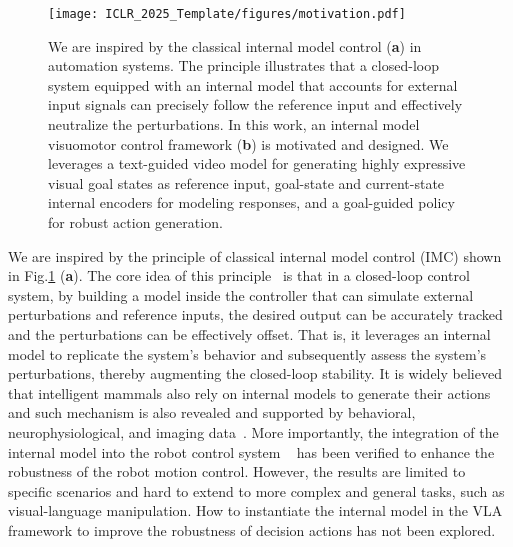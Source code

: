 \begin{figure}[t]
\vspace{-2em}
\centering
\texttt{[image: ICLR\_2025\_Template/figures/motivation.pdf]}
\caption{
We are inspired by the classical internal model control (\textbf{a}) in automation systems. 
The principle illustrates that a closed-loop system equipped with an internal model that accounts for external input signals can precisely follow the reference input and effectively neutralize the perturbations.
In this work, an internal model visuomotor control framework (\textbf{b}) is motivated and designed.
We leverages a text-guided video model for generating highly expressive visual goal states as reference input, goal-state and current-state internal encoders for modeling responses, and a goal-guided policy for robust action generation.
} 
\vspace{-2em}
  \label{fig:IMC_motivation}
\end{figure}
We are inspired by the principle of classical internal model control (IMC) shown in Fig.\ref{fig:IMC_motivation} (\textbf{a}). 
The core idea of this principle~\citep{rivera1986internal} is that in a closed-loop control system, by building a model inside the controller that can simulate external perturbations and reference inputs, the desired output can be accurately tracked and the perturbations can be effectively offset. 
That is, it leverages an internal model to replicate the system's behavior and subsequently assess the system's perturbations, thereby augmenting the closed-loop stability.  It is widely believed that intelligent mammals also rely on internal models to generate their actions ~\citep{nguyen2011model} and such mechanism is also revealed and supported by behavioral, neurophysiological, and imaging data~\citep{kawato1999internal}. More importantly, the integration of the internal model into the robot control system ~\citep{emken2005robot} has been verified to enhance the robustness of the robot motion control. 
However, the results are limited to specific scenarios and hard to extend to more complex and general tasks, such as visual-language manipulation. 
How to instantiate the internal model in the VLA framework to improve the robustness of decision actions has not been explored.



